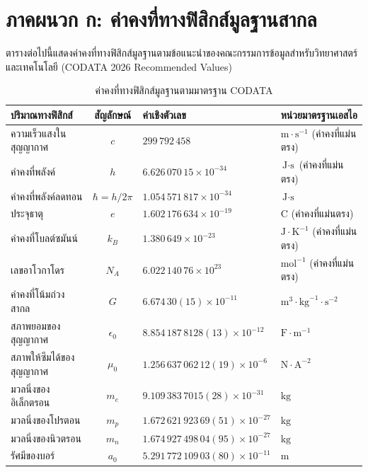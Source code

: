 \chapter*{ภาคผนวก ก: ค่าคงที่ทางฟิสิกส์มูลฐานสากล}

ตารางต่อไปนี้แสดงค่าคงที่ทางฟิสิกส์มูลฐานตามข้อแนะนำของคณะกรรมการข้อมูลสำหรับวิทยาศาสตร์และเทคโนโลยี (CODATA 2026 Recommended Values)

\vspace{0.4cm}
\begin{table}[htbp]
\centering
\small
\begin{tabularx}{\textwidth}{p{4.8cm} c l X}
\toprule
\textbf{ปริมาณทางฟิสิกส์} & \textbf{สัญลักษณ์} & \textbf{ค่าเชิงตัวเลข} & \textbf{หน่วยมาตรฐานเอสไอ} \\
\midrule
ความเร็วแสงในสุญญากาศ & $c$ & $299\,792\,458$ & $\text{m}\cdot\text{s}^{-1}$ (ค่าคงที่แม่นตรง) \\
ค่าคงที่พลังค์ & $h$ & $6.626\,070\,15 \times 10^{-34}$ & $\text{J}\cdot\text{s}$ (ค่าคงที่แม่นตรง) \\
ค่าคงที่พลังค์ลดทอน & $\hbar = h/2\pi$ & $1.054\,571\,817 \times 10^{-34}$ & $\text{J}\cdot\text{s}$ \\
ประจุธาตุ & $e$ & $1.602\,176\,634 \times 10^{-19}$ & $\text{C}$ (ค่าคงที่แม่นตรง) \\
ค่าคงที่โบลต์ซมันน์ & $k_B$ & $1.380\,649 \times 10^{-23}$ & $\text{J}\cdot\text{K}^{-1}$ (ค่าคงที่แม่นตรง) \\
เลขอาโวกาโดร & $N_A$ & $6.022\,140\,76 \times 10^{23}$ & $\text{mol}^{-1}$ (ค่าคงที่แม่นตรง) \\
ค่าคงที่โน้มถ่วงสากล & $G$ & $6.674\,30(15) \times 10^{-11}$ & $\text{m}^3\cdot\text{kg}^{-1}\cdot\text{s}^{-2}$ \\
สภาพยอมของสุญญากาศ & $\epsilon_0$ & $8.854\,187\,8128(13) \times 10^{-12}$ & $\text{F}\cdot\text{m}^{-1}$ \\
สภาพให้ซึมได้ของสุญญากาศ & $\mu_0$ & $1.256\,637\,062\,12(19) \times 10^{-6}$ & $\text{N}\cdot\text{A}^{-2}$ \\
มวลนิ่งของอิเล็กตรอน & $m_e$ & $9.109\,383\,7015(28) \times 10^{-31}$ & $\text{kg}$ \\
มวลนิ่งของโปรตอน & $m_p$ & $1.672\,621\,923\,69(51) \times 10^{-27}$ & $\text{kg}$ \\
มวลนิ่งของนิวตรอน & $m_n$ & $1.674\,927\,498\,04(95) \times 10^{-27}$ & $\text{kg}$ \\
รัศมีของบอร์ & $a_0$ & $5.291\,772\,109\,03(80) \times 10^{-11}$ & $\text{m}$ \\
\bottomrule
\end{tabularx}
\caption{ค่าคงที่ทางฟิสิกส์มูลฐานตามมาตรฐาน CODATA}
\label{tab:codata_constants}
\end{table}
